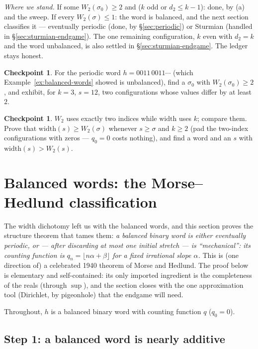 \documentclass[11pt,reqno]{amsart}
\theoremstyle{plain}
\theoremstyle{definition}
\newtheorem{checkpoint}[theorem]{Checkpoint}   %
\theoremstyle{remark}
\begin{document}
\emph{Where we stand.} If some $W_2(\sigma_0) \ge 2$ and ($k$ odd or $d_2 \le
k-1$): done, by (a) and the sweep. If every $W_2(\sigma) \le 1$: the word is
balanced, and the next section classifies it --- eventually periodic (done, by
\S\ref{sec:periodic}) or Sturmian (handled in \S\ref{sec:sturmian-endgame}). The
one remaining configuration, $k$ even with $d_2 = k$ and the word unbalanced, is
also settled in \S\ref{sec:sturmian-endgame}. The ledger stays honest.

\begin{checkpoint}
For the periodic word $h = 0011\,0011\cdots$ (which Example~\ref{ex:balanced-words}
showed is unbalanced), find a $\sigma_0$ with $W_2(\sigma_0) \ge 2$, and exhibit,
for $k = 3$, $s = 12$, two configurations whose values differ by at least $2$.
\end{checkpoint}

\begin{checkpoint}
$W_2$ uses exactly two indices while $\mathrm{width}$ uses $k$; compare them. Prove
that $\mathrm{width}(s) \ge W_2(\sigma)$ whenever $s \ge \sigma$ and $k \ge 2$ (pad
the two-index configurations with zeros --- $q_0 = 0$ costs nothing), and find a
word and an $s$ with $\mathrm{width}(s) > W_2(s)$.
\end{checkpoint}

\section{Balanced words: the Morse--Hedlund classification}\label{sec:sturmian-course}

The width dichotomy left us with the balanced words, and this section proves the
structure theorem that tames them: \emph{a balanced binary word is either eventually
periodic, or --- after discarding at most one initial stretch --- is ``mechanical'':
its counting function is $q_n = \lfloor n\alpha + \beta \rfloor$ for a fixed
irrational slope $\alpha$.} This is (one direction of) a celebrated 1940 theorem of
Morse and Hedlund. The proof below is elementary and self-contained: its only
imported ingredient is the completeness of the reals (through $\sup$), and the
section closes with the one approximation tool (Dirichlet, by pigeonhole) that the
endgame will need.

Throughout, $h$ is a balanced binary word with counting function $q$ ($q_0 = 0$).

\subsection{Step 1: a balanced word is nearly additive}
\end{document}
